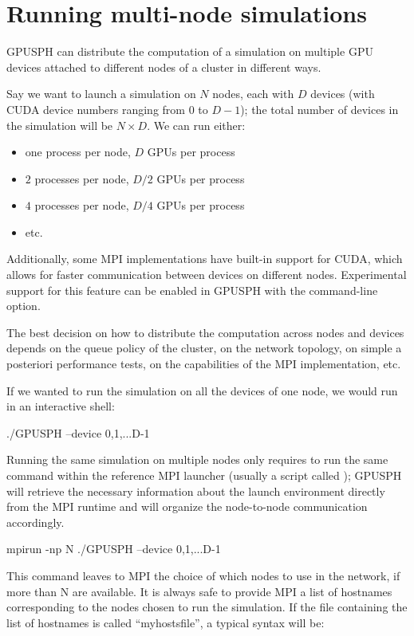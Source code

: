 \documentclass{../GPUSPHtemplate}
\begin{document}
\section{Running multi-node simulations}

GPUSPH can distribute the computation of a simulation on multiple 
GPU devices attached to different nodes of a cluster in different ways.

Say we want to launch a simulation on $N$ nodes, each with $D$ devices 
(with CUDA device numbers ranging from $0$ to $D-1$); 
the total number of devices in the simulation will be $N \times D$. We can run either:
\begin{itemize}
\item one process per node, $D$ GPUs per process
\item $2$ processes per node, $D/2$ GPUs per process
\item $4$ processes per node, $D/4$ GPUs per process
\item etc.
\end{itemize}

Additionally, some MPI implementations have built-in support for CUDA, 
which allows for faster communication between devices on different nodes. 
Experimental support for this feature can be enabled in GPUSPH with the  command-line option.

The best decision on how to distribute the computation across nodes and devices depends on 
the queue policy of the cluster, on the network topology, on simple a posteriori performance tests, 
on the capabilities of the MPI implementation, etc.

If we wanted to run the simulation on all the devices of one node, we would run in an interactive shell:

\begin{shellcode}
./GPUSPH --device 0,1,...D-1
\end{shellcode}

Running the same simulation on multiple nodes only requires to run 
the same command within the reference MPI launcher (usually a script called ); 
GPUSPH will retrieve the necessary information about the launch environment 
directly from the MPI runtime and will organize the node-to-node communication accordingly.

\begin{shellcode}
mpirun -np N ./GPUSPH --device 0,1,...D-1
\end{shellcode}

This command leaves to MPI the choice of which nodes to use in the network, 
if more than N are available. 
It is always safe to provide MPI a list of hostnames corresponding 
to the nodes chosen to run the simulation. 
If the file containing the list of hostnames is called “myhostsfile”, a typical syntax will be:
\end{document}
